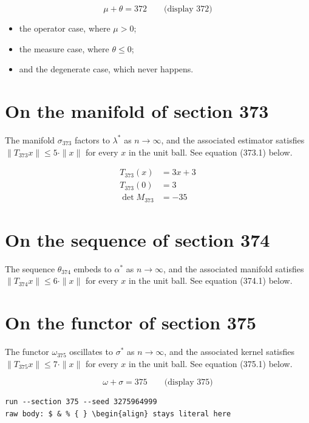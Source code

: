 \documentclass{article}
\begin{document}
$$
\mu + \theta = 372 \qquad \text{(display 372)}
$$

\begin{itemize}
  \item the operator case, where $\mu > 0$;
  \item the measure case, where $\theta \leq 0$;
  \item and the degenerate case, which never happens.
\end{itemize}

\section{On the manifold of section 373}
The manifold $\sigma_{373}$ factors to $\lambda^{*}$ as $n \to \infty$,
and the associated estimator satisfies $\|T_{373} x\| \leq 5 \cdot \|x\|$
for every $x$ in the unit ball. See equation (373.1) below.

\begin{align}
T_{373}(x) &= 3 x + 3 \\
T_{373}(0) &= 3 \\
\det M_{373} &= -35
\end{align}

\section{On the sequence of section 374}
The sequence $\theta_{374}$ embeds to $\alpha^{*}$ as $n \to \infty$,
and the associated manifold satisfies $\|T_{374} x\| \leq 6 \cdot \|x\|$
for every $x$ in the unit ball. See equation (374.1) below.

\section{On the functor of section 375}
The functor $\omega_{375}$ oscillates to $\sigma^{*}$ as $n \to \infty$,
and the associated kernel satisfies $\|T_{375} x\| \leq 7 \cdot \|x\|$
for every $x$ in the unit ball. See equation (375.1) below.

$$
\omega + \sigma = 375 \qquad \text{(display 375)}
$$

\begin{verbatim}
run --section 375 --seed 3275964999
raw body: $ & % { } \begin{align} stays literal here
\end{verbatim}
\end{document}
